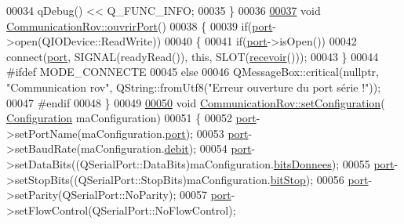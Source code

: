 \begin{DoxyCode}
00034     qDebug() << Q\_FUNC\_INFO;
00035 \}
00036 
\hyperlink{class_communication_rov_acc835a6d927b1b8cd631e64ffabca0b4}{00037} \textcolor{keywordtype}{void} \hyperlink{class_communication_rov_acc835a6d927b1b8cd631e64ffabca0b4}{CommunicationRov::ouvrirPort}()
00038 \{
00039     \textcolor{keywordflow}{if}(\hyperlink{class_communication_rov_a21b62067ef0b2a6aec339df60b4abd72}{port}->open(QIODevice::ReadWrite))
00040     \{
00041         \textcolor{keywordflow}{if}(\hyperlink{class_communication_rov_a21b62067ef0b2a6aec339df60b4abd72}{port}->isOpen())
00042             connect(\hyperlink{class_communication_rov_a21b62067ef0b2a6aec339df60b4abd72}{port}, SIGNAL(readyRead()), \textcolor{keyword}{this}, SLOT(\hyperlink{class_communication_rov_a75de69ca01c849f760d7efea1b2722b9}{recevoir}()));
00043     \}
00044 \textcolor{preprocessor}{    #ifdef MODE\_CONNECTE}
00045     \textcolor{keywordflow}{else}
00046         QMessageBox::critical(\textcolor{keyword}{nullptr}, \textcolor{stringliteral}{"Communication rov"}, QString::fromUtf8(\textcolor{stringliteral}{"Erreur ouverture du port
       série !"}));
00047 \textcolor{preprocessor}{    #endif}
00048 \}
00049 
\hyperlink{class_communication_rov_a3d83702b8b9a753761d924556e55c38d}{00050} \textcolor{keywordtype}{void} \hyperlink{class_communication_rov_a3d83702b8b9a753761d924556e55c38d}{CommunicationRov::setConfiguration}(
      \hyperlink{struct_configuration}{Configuration} maConfiguration)
00051 \{
00052     \hyperlink{class_communication_rov_a21b62067ef0b2a6aec339df60b4abd72}{port}->setPortName(maConfiguration.\hyperlink{struct_configuration_acc40b4f298cb215a94fb43976ef7d3a8}{port});
00053     \hyperlink{class_communication_rov_a21b62067ef0b2a6aec339df60b4abd72}{port}->setBaudRate(maConfiguration.\hyperlink{struct_configuration_ab714d6036189bf451e566e6c6a971c85}{debit});
00054     \hyperlink{class_communication_rov_a21b62067ef0b2a6aec339df60b4abd72}{port}->setDataBits((QSerialPort::DataBits)maConfiguration.\hyperlink{struct_configuration_a37e0691e4a25b11bd86a52bc68c81f93}{bitsDonnees});
00055     \hyperlink{class_communication_rov_a21b62067ef0b2a6aec339df60b4abd72}{port}->setStopBits((QSerialPort::StopBits)maConfiguration.\hyperlink{struct_configuration_a9c24ff9a3e5a24b14e1ac8bc03de907d}{bitStop});
00056     \hyperlink{class_communication_rov_a21b62067ef0b2a6aec339df60b4abd72}{port}->setParity(QSerialPort::NoParity);
00057     \hyperlink{class_communication_rov_a21b62067ef0b2a6aec339df60b4abd72}{port}->setFlowControl(QSerialPort::NoFlowControl);

\end{DoxyCode}

